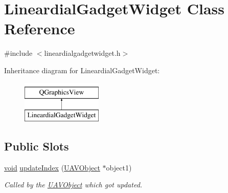 \hypertarget{class_lineardial_gadget_widget}{\section{Lineardial\-Gadget\-Widget Class Reference}
\label{class_lineardial_gadget_widget}
}


{\ttfamily \#include $<$lineardialgadgetwidget.\-h$>$}

Inheritance diagram for Lineardial\-Gadget\-Widget\-:\begin{figure}[H]
\begin{center}
\leavevmode
\includegraphics[height=2.000000cm]{class_lineardial_gadget_widget}
\end{center}
\end{figure}
\subsection*{Public Slots}
\begin{DoxyCompactItemize}
\item 
\hyperlink{group___u_a_v_objects_plugin_ga444cf2ff3f0ecbe028adce838d373f5c}{void} \hyperlink{group___linear_dial_plugin_gae4ba61f22d069348e46919a30913ee34}{update\-Index} (\hyperlink{class_u_a_v_object}{U\-A\-V\-Object} $\ast$object1)
\begin{DoxyCompactList}\small\item\em Called by the \hyperlink{class_u_a_v_object}{U\-A\-V\-Object} which got updated. \end{DoxyCompactList}\end{DoxyCompactItemize}
